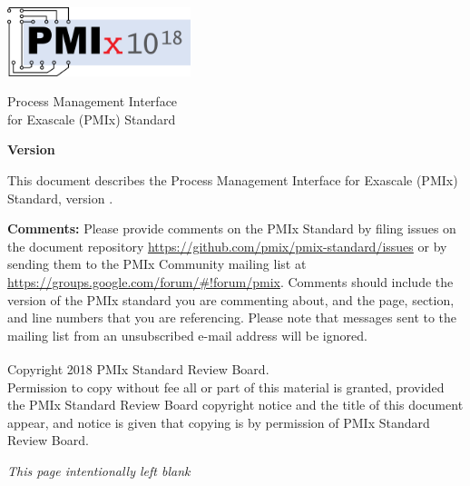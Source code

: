 
  \begin{titlepage}
    \begin{flushleft}
     \hspace{-6em} \includegraphics[width=0.4\textwidth]{figs/pmix-logo.png}
    \end{flushleft}

    \begin{adjustwidth}{-0.75in}{0in}
    \begin{center}
      \Huge
      \textsf{Process Management Interface\\for Exascale (PMIx) Standard}

      \vspace{1.0in}
	  \huge
      \textbf{Version \VER{}}

      \vspace{0.15in}
	  \Large
      \textbf{\VERDATE}

    \end{center}
    \end{adjustwidth}

    \vspace{1.2in}

\par
This document describes the Process Management Interface for Exascale (PMIx) Standard, version \VER{}.

\par
\textbf{Comments:}
Please provide comments on the PMIx Standard by filing issues on the document repository \url{https://github.com/pmix/pmix-standard/issues} or by sending them to the PMIx Community mailing list at \url{https://groups.google.com/forum/#!forum/pmix}.
Comments should include the version of the PMIx standard you are commenting about, and the page, section, and line numbers that you are referencing.
Please note that messages sent to the mailing list from an unsubscribed e-mail address will be ignored.

\vfill

\begin{adjustwidth}{0pt}{1em}\setlength{\parskip}{0.25\baselineskip}%
Copyright \textsuperscript{\textcopyright} 2018 PMIx Standard Review Board.\\
Permission to copy without fee all or part of this material is granted,
provided the PMIx Standard Review Board copyright notice and
the title of this document appear, and notice is given that copying is by
permission of PMIx Standard Review Board.
\end{adjustwidth}

  \end{titlepage}

\clearpage
\thispagestyle{empty}
\phantom{a}
\begin{center}
\emph{This page intentionally left blank}
\end{center}

\vfill

